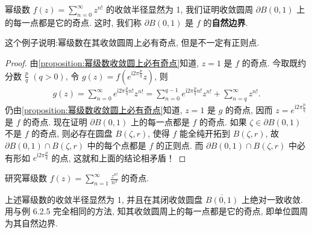 \documentclass[../../main.tex]{subfiles}%
\begin{document}
\begin{examples}
幂级数 \(f(z)=\sum\limits_{n=0}^{\infty} z^{n!}\) 的收敛半径显然为 1, 我们证明收敛圆周 \(\partial B(0,1)\) 上的每一点都是它的奇点. 这时, 我们称 \(\partial B(0,1)\) 是 \(f\) 的\textbf{自然边界}.
\end{examples}
\begin{remark}
这个例子说明:幂级数在其收敛圆周上必有奇点, 但是不一定有正则点.
\end{remark}
\begin{proof}
由\cref{proposition:幂级数收敛圆上必有奇点}知道, \(z=1\) 是 \(f\) 的奇点. 今取既约分数 \(\frac{p}{q}\) \((q>0)\), 令 \(g(z) = f(e^{\mathrm{i}2\pi \frac{p}{q}} z)\), 则
\begin{align*}
g(z) = \sum_{n=0}^{\infty} e^{\mathrm{i}2\pi \frac{p}{q} n!} z^{n!} = \sum_{n=0}^{q-1} e^{\mathrm{i}2\pi \frac{p}{q} n!} z^{n!} + \sum_{n=q}^{\infty} z^{n!}.
\end{align*}
仍由\cref{proposition:幂级数收敛圆上必有奇点}知道, \(z=1\) 是 \(g\) 的奇点, 因而 \(z=e^{\mathrm{i}2\pi \frac{p}{q}}\) 是 \(f\) 的奇点. 现在证明 \(\partial B(0,1)\) 上的每一点都是 \(f\) 的奇点. 如果 \(\zeta \in \partial B(0,1)\) 不是 \(f\) 的奇点, 则必存在圆盘 \(B(\zeta,r)\), 使得 \(f\) 能全纯开拓到 \(B(\zeta,r)\), 故 \(\partial B(0,1) \cap B(\zeta,r)\) 中的每个点都是 \(f\) 的正则点. 而 \(\partial B(0,1) \cap B(\zeta,r)\) 中必有形如 \(e^{\mathrm{i}2\pi \frac{p}{q}}\) 的点, 这就和上面的结论相矛盾！\end{proof}

\begin{examples}
研究幂级数 \(f(z) = \sum\limits_{n=1}^{\infty} \frac{z^{n!}}{n^2}\) 的奇点.
\end{examples}
\begin{solution}
上述幂级数的收敛半径显然为 1, 并且在其闭收敛圆盘 \(\overline{B(0,1)}\) 上绝对一致收敛. 用与例 6.2.5 完全相同的方法, 知其收敛圆周上的每一点都是它的奇点, 即单位圆周为其自然边界. 
\end{solution}
\end{document}
